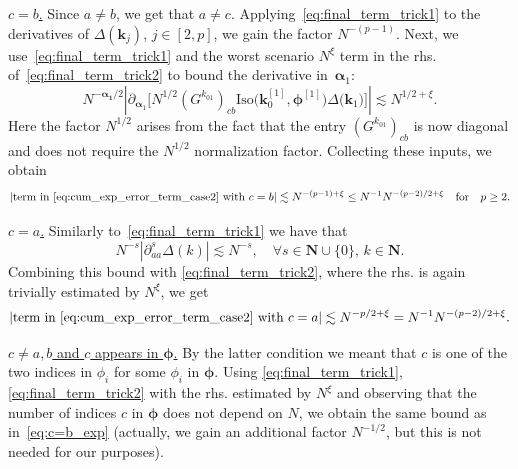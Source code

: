 \documentclass[10pt]{amsart}
\numberwithin{equation}{section}
\newcommand{\N}{\mathbf{N}}
\begin{document}
\noindent\underline{$c=b$.} Since $a\neq b$, we get that $a\neq c$. Applying~\eqref{eq:final_term_trick1} to the derivatives of $\Delta(\bm{k}_j)$, $j\in [2,p]$, we gain the factor $N^{-(p-1)}$. Next, we use~\eqref{eq:final_term_trick1} and the worst scenario $N^\xi$ term in the rhs. of~\eqref{eq:final_term_trick2} to bound the derivative in~$\bm{\alpha}_1$:
\begin{equation}
N^{-\bm{\alpha_1}/2}\left\vert\partial_{\bm{\alpha}_1}\Big[N^{1/2}\left(G^{k_{01}}\right)_{cb}\mathrm{Iso}\big(\bm{k}_0^{[1]},\bm{\phi}^{[1]}\big)\Delta\big(\bm{k}_1\big)\Big]\right\vert \lesssim N^{1/2+\xi}.
\end{equation}
Here the factor $N^{1/2}$ arises from the fact that the entry $\left(G^{k_{01}}\right)_{cb}$ is now diagonal and does not require the $N^{1/2}$ normalization factor. Collecting these inputs, we obtain
\begin{equation}
\left\vert\text{term in }\eqref{eq:cum_exp_error_term_case2}\text{ with }c=b\right\vert \lesssim N^{-(p-1)+\xi}\le N^{-1}N^{-(p-2)/2+\xi}\quad\text{for}\quad p\ge 2.
\label{eq:c=b_exp}
\end{equation}

\smallskip

\noindent\underline{$c=a$.} Similarly to~\eqref{eq:final_term_trick1} we have that
\begin{equation}
N^{-s}\left\vert\partial_{aa}^s \Delta(k)\right\vert \lesssim N^{-s},\quad \forall s\in\N\cup\{0\},\, k\in \N.
\end{equation}
Combining this bound with \eqref{eq:final_term_trick2}, where the rhs. is again trivially estimated by $N^\xi$, we get
\begin{equation}
\left\vert\text{term in }\eqref{eq:cum_exp_error_term_case2}\text{ with }c=a\right\vert \lesssim N^{-p/2+\xi}= N^{-1}N^{-(p-2)/2+\xi}.
\end{equation}

\smallskip

\noindent\underline{$c\neq a,b$ and $c$ appears in $\bm{\phi}$.} By the latter condition we meant that $c$ is one of the two indices in $\phi_i$ for some $\phi_i$ in $\bm{\phi}$. Using \eqref{eq:final_term_trick1}, \eqref{eq:final_term_trick2} with the rhs. estimated by $N^\xi$ and observing that the number of indices $c$ in $\bm{\phi}$ does not depend on $N$, we obtain the same bound as in~\eqref{eq:c=b_exp} (actually, we gain an additional factor $N^{-1/2}$, but this is not needed for our purposes). 

\smallskip
\end{document}
